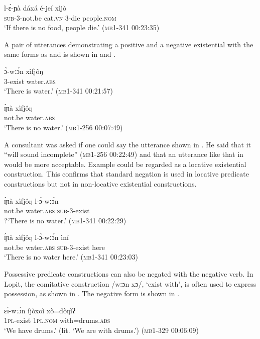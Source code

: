 \documentclass[output=paper,colorlinks,citecolor=brown,draftmode]{langscibook}
\begin{document}
\ea\label{ex:lop:41}
        \gll l-ɛ́-ɲà dáxá é-jeí xìjò  \\ 
             \textsc{sub-3-}not.be eat.\textsc{vn} 3-die people.\textsc{nom} \\
        \glt ‘If there is no food, people die.’ (\textsc{mb1-341} 00:23:35)
\z

A pair of utterances demonstrating a positive and a negative existential with the same forms as  and  is shown in  and .

\ea\label{ex:lop:42}
        \gll ɔ̀-wːɔ́n xìfjôŋ \\ 
             3-exist water.\textsc{abs} \\
        \glt ‘There is water.’ (\textsc{mb1-341} 00:21:57)
\z

\ea\label{ex:lop:43}
        \gll ɪ́ɲà xìfjôŋ \\ 
             not.be water.\textsc{abs} \\
        \glt ‘There is no water.’    (\textsc{mb1-256} \textsc{00}:07:49)
\z

A consultant was asked if one could say the utterance shown in . He said that it “will sound incomplete” (\textsc{mb1-256} \textsc{00}:22:49) and that an utterance like that in  would be more acceptable. Example  could be regarded as a locative existential construction. This confirms that standard negation is used in locative predicate constructions but not in non-locative existential constructions. 

\ea\label{ex:lop:44}
        \gll ɪ́ɲà xìfjôŋ l-ɔ̀-wːɔ́n   \\ 
             not.be water.\textsc{abs} \textsc{sub-3-}exist \\
        \glt ?‘There is no water.’ (\textsc{mb1-341} 00:22:29)
\z

\ea\label{ex:lop:45}
        \gll ɪ́ɲà xìfjôŋ l-ɔ̀-wːɔ́n ìní  \\ 
             not.be water.\textsc{abs} \textsc{sub-3-}exist here \\
        \glt ‘There is no water here.’ (\textsc{mb1-341} 00:23:03)
\z

Possessive predicate constructions can also be negated with the negative verb.  In Lopit, the comitative construction /wːɔn xɔ/, ‘exist with’, is often used to express possession, as shown in . The negative form is shown in .

\ea\label{ex:lop:46}
        \gll ɛɪ́-wːɔ́n íjòxoì xò=dòŋìʔ \\ 
             1\textsc{pl}{}-exist 1\textsc{pl.nom} with=drums.\textsc{abs} \\
        \glt ‘We have drums.' (lit. ‘We are with drums.’)    (\textsc{mb1-329} \textsc{00}:06:09)
\z
\end{document}
